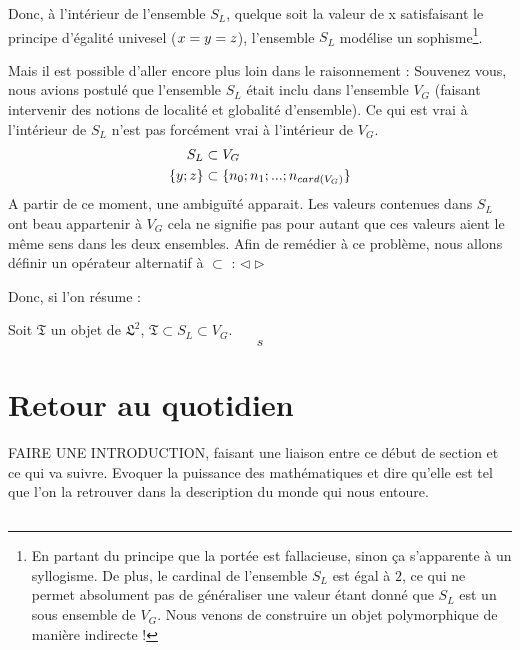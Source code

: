 \documentclass[12pt]{article} %
\begin{document}
Donc, à l'intérieur de l'ensemble $S_{L}$, quelque soit la valeur de x satisfaisant le principe d'égalité univesel ($x \space = \space y \space = \space z$), l'ensemble $S_{L}$ modélise un sophisme\footnote{En partant du principe que la portée est fallacieuse, sinon ça s'apparente à un syllogisme. De plus, le cardinal de l'ensemble $S_L$ est égal à $2$, ce qui ne permet absolument pas de généraliser une valeur étant donné que $S_L$ est un sous ensemble de $V_G$. \newline Nous venons de construire un objet polymorphique de manière indirecte !}. \newline

Mais il est possible d'aller encore plus loin dans le raisonnement : \newline
Souvenez vous, nous avions postulé que l'ensemble $S_{L}$ était inclu dans l'ensemble $V_{G}$ (faisant intervenir des notions de localité et globalité d'ensemble). \newline
Ce qui est vrai à l'intérieur de $S_{L}$ n'est pas forcément vrai à l'intérieur de $V_{G}$.
\begin{align}
S_L & \subset V_G \\
\{y;\space z\} & \subset \{n_{0}; \space n_{1}; \space ...; \space n_{card(V_G)}\}
\end{align}
A partir de ce moment, une ambiguïté apparait. Les valeurs contenues dans $S_L$ ont beau appartenir à $V_G$ cela ne signifie pas pour autant que ces valeurs aient le même sens dans les deux ensembles. Afin de remédier à ce problème, nous allons définir un opérateur alternatif à $\subset$ : $\triangleleft\triangleright$


Donc, si l'on résume : 

Soit $\mathfrak{T}$ un objet de $\mathfrak{L}^2$, $\mathfrak{T} \subset S_L \subset V_G$.
\begin{equation}
s
\end{equation}

\newpage

\section{Retour au quotidien}
FAIRE UNE INTRODUCTION, faisant une liaison entre ce début de section et ce qui va suivre.
Evoquer la puissance des mathématiques et dire qu'elle est tel que l'on la retrouver dans la description du monde qui nous entoure.

\subsection{}
\end{document}
